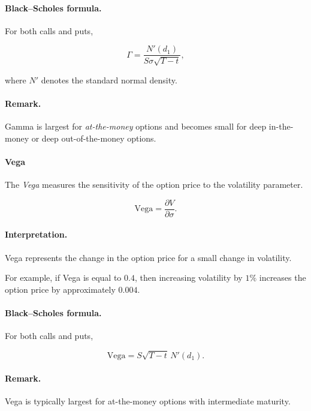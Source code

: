 \documentclass[11pt]{article}
\newcommand{\1}{\mathbf{1}}
\theoremstyle{plain}
\theoremstyle{definition}
\theoremstyle{remark}
\begin{document}
\paragraph{Black--Scholes formula.}

For both calls and puts,

\[
\Gamma
=
\frac{N'(d_1)}{S\sigma\sqrt{T-t}},
\]

where \(N'\) denotes the standard normal density.

\paragraph{Remark.}

Gamma is largest for \emph{at-the-money} options and becomes small for
deep in-the-money or deep out-of-the-money options.

\paragraph{Vega}

The \emph{Vega} measures the sensitivity of the option price to the
volatility parameter.

\[
\text{Vega} = \frac{\partial V}{\partial \sigma}.
\]

\paragraph{Interpretation.}

Vega represents the change in the option price for a small change in
volatility.

For example, if Vega is equal to \(0.4\), then increasing volatility by
\(1\%\) increases the option price by approximately \(0.004\).

\paragraph{Black--Scholes formula.}

For both calls and puts,

\[
\text{Vega}
=
S \sqrt{T-t}\, N'(d_1).
\]

\paragraph{Remark.}

Vega is typically largest for at-the-money options with intermediate
maturity.
\end{document}

